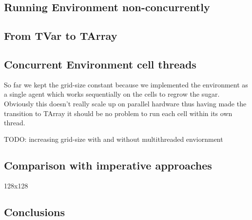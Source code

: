 \subsection{Running Environment non-concurrently}

\subsection{From TVar to TArray}

\subsection{Concurrent Environment cell threads}
So far we kept the grid-size constant because we implemented the environment as a single agent which works sequentially on the cells to regrow the sugar. Obviously this doesn't really scale up on parallel hardware thus having made the transition to TArray it should be no problem to run each cell within its own thread.

TODO: increasing grid-size with and without multithreaded enviornment

\subsection{Comparison with imperative approaches}
128x128

\subsection{Conclusions}